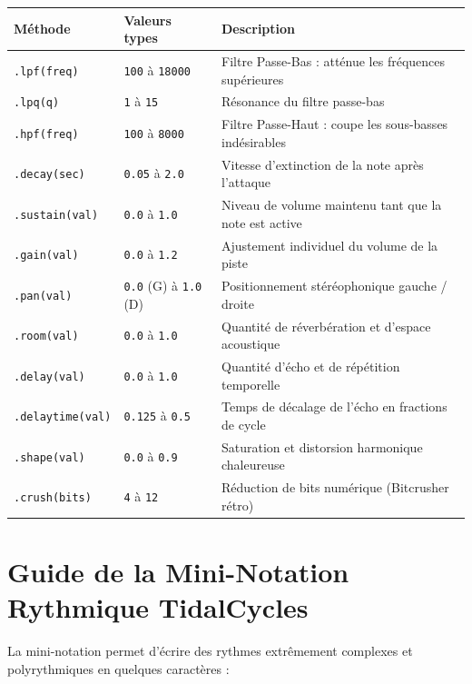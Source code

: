 \documentclass[a4paper,10pt]{article}
\begin{document}
\begin{tabularx}{\linewidth}{|l|l|X|}
\hline
\textbf{Méthode} & \textbf{Valeurs types} & \textbf{Description} \\
\hline
\texttt{.lpf(freq)} & \texttt{100} à \texttt{18000} & Filtre Passe-Bas : atténue les fréquences supérieures \\
\texttt{.lpq(q)} & \texttt{1} à \texttt{15} & Résonance du filtre passe-bas \\
\texttt{.hpf(freq)} & \texttt{100} à \texttt{8000} & Filtre Passe-Haut : coupe les sous-basses indésirables \\
\texttt{.decay(sec)} & \texttt{0.05} à \texttt{2.0} & Vitesse d'extinction de la note après l'attaque \\
\texttt{.sustain(val)} & \texttt{0.0} à \texttt{1.0} & Niveau de volume maintenu tant que la note est active \\
\texttt{.gain(val)} & \texttt{0.0} à \texttt{1.2} & Ajustement individuel du volume de la piste \\
\texttt{.pan(val)} & \texttt{0.0} (G) à \texttt{1.0} (D) & Positionnement stéréophonique gauche / droite \\
\texttt{.room(val)} & \texttt{0.0} à \texttt{1.0} & Quantité de réverbération et d'espace acoustique \\
\texttt{.delay(val)} & \texttt{0.0} à \texttt{1.0} & Quantité d'écho et de répétition temporelle \\
\texttt{.delaytime(val)} & \texttt{0.125} à \texttt{0.5} & Temps de décalage de l'écho en fractions de cycle \\
\texttt{.shape(val)} & \texttt{0.0} à \texttt{0.9} & Saturation et distorsion harmonique chaleureuse \\
\texttt{.crush(bits)} & \texttt{4} à \texttt{12} & Réduction de bits numérique (Bitcrusher rétro) \\
\hline
\end{tabularx}

\newpage

\section{Guide de la Mini-Notation Rythmique TidalCycles}
La mini-notation permet d'écrire des rythmes extrêmement complexes et polyrythmiques en quelques caractères :
\end{document}
